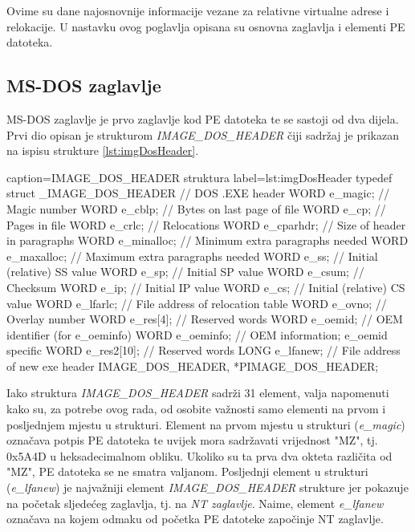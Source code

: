 \documentclass[times, utf8, diplomski, numeric]{fer}
\begin{document}
Ovime su dane najosnovnije informacije vezane za relativne
virtualne adrese i relokacije. U nastavku ovog poglavlja opisana
su osnovna zaglavlja i elementi PE datoteka.


\subsection{MS-DOS zaglavlje}

MS-DOS zaglavlje je prvo zaglavlje kod PE datoteka te se sastoji
od dva dijela. Prvi dio opisan je strukturom
\emph{IMAGE\_DOS\_HEADER} čiji sadržaj je prikazan na ispisu strukture \ref{lst:imgDosHeader}.

\begin{struktura} {caption=IMAGE\_DOS\_HEADER struktura} {label=lst:imgDosHeader}
typedef struct _IMAGE_DOS_HEADER {      // DOS .EXE header
	WORD   e_magic;                     // Magic number
	WORD   e_cblp;                      // Bytes on last page of file
	WORD   e_cp;                        // Pages in file
	WORD   e_crlc;                      // Relocations
	WORD   e_cparhdr;                   // Size of header in paragraphs
	WORD   e_minalloc;                  // Minimum extra paragraphs needed
	WORD   e_maxalloc;                  // Maximum extra paragraphs needed
	WORD   e_ss;                        // Initial (relative) SS value
	WORD   e_sp;                        // Initial SP value
	WORD   e_csum;                      // Checksum
	WORD   e_ip;                        // Initial IP value
	WORD   e_cs;                        // Initial (relative) CS value
	WORD   e_lfarlc;                    // File address of relocation table
	WORD   e_ovno;                      // Overlay number
	WORD   e_res[4];                    // Reserved words
	WORD   e_oemid;                     // OEM identifier (for e_oeminfo)
	WORD   e_oeminfo;                   // OEM information; e_oemid specific
	WORD   e_res2[10];                  // Reserved words
	LONG   e_lfanew;                    // File address of new exe header
} IMAGE_DOS_HEADER, *PIMAGE_DOS_HEADER;
\end{struktura}

Iako struktura \emph{IMAGE\_DOS\_HEADER} sadrži 31 element, valja
napomenuti kako su, za potrebe ovog rada, od osobite važnosti
samo elementi na prvom i posljednjem mjestu u strukturi. Element
na prvom mjestu u strukturi (\emph{e\_magic}) označava potpis PE
datoteka te uvijek mora sadržavati vrijednost "MZ", tj. 0x5A4D u
heksadecimalnom obliku. Ukoliko su ta prva dva okteta različita
od "MZ", PE datoteka se ne smatra valjanom. Posljednji element u
strukturi (\emph{e\_lfanew}) je najvažniji element
\emph{IMAGE\_DOS\_HEADER} strukture jer pokazuje na početak
sljedećeg zaglavlja, tj. na \emph{NT zaglavlje}. Naime, element 
\emph{e\_lfanew} označava na kojem odmaku od početka PE datoteke
započinje NT zaglavlje.
\end{document}
